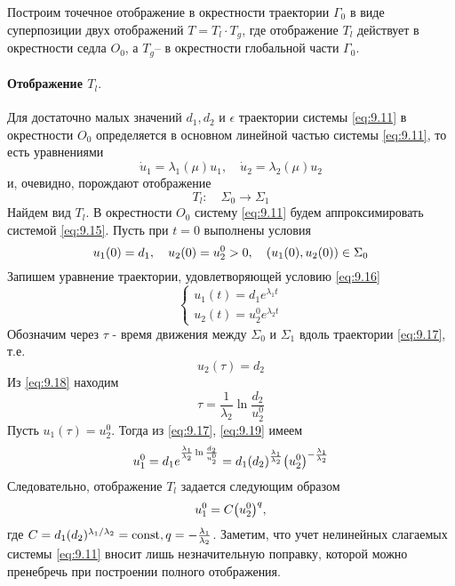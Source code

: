 Построим точечное отображение в окрестности траектории $\Gamma_0$ в виде суперпозиции двух отображений $T=T_l \cdot T_g$, где отображение $T_l$ действует в окрестности седла $O_0$, а $T_g$-- в окрестности глобальной части $\Gamma_0$.

\paragraph{Отображение $T_l.$}%

Для достаточно малых значений $d_1,d_2$ и $\epsilon$ траектории системы \eqref{eq:9.11} в окрестности $O_0$ определяется в основном линейной частью системы \eqref{eq:9.11}, то есть уравнениями
\begin{equation}
        \label{eq:9.15}
        \dot u_1 = \lambda_1(\mu) u_1,\quad \dot u_2 = \lambda_2(\mu) u_2
\end{equation}
и, очевидно, порождают отображение
\begin{equation}
        \label{eq:}
        T_l:\quad \Sigma_0 \to \Sigma_1
\end{equation}
Найдем вид $T_l$. В окрестности $O_0$ систему \eqref{eq:9.11} будем аппроксимировать системой \eqref{eq:9.15}. Пусть при $t=0$ выполнены условия
\begin{equation}
        \label{eq:9.16}
        u_1(0) = d_1, \quad u_2(0) = u_2^0>0,\quad \qty( u_1(0),u_2(0) ) \in \Sigma_0
\end{equation}
Запишем уравнение траектории, удовлетворяющей условию \eqref{eq:9.16}
\begin{equation}
        \label{eq:9.17}
        \begin{cases}
                u_1(t) = d_1 e^{\lambda_1t} \\
                u_2(t) = u_2^0 e^{\lambda_2t}
        \end{cases}
\end{equation}
Обозначим через $\tau$ - время движения между $\Sigma_0$ и $\Sigma_1 $ вдоль траектории 
\eqref{eq:9.17}, т.е.
\begin{equation}
        \label{eq:9.18}
        u_2(\tau) = d_2
\end{equation}
Из \eqref{eq:9.18} находим
\begin{equation}
        \label{eq:9.18}
        \tau = \frac{1}{\lambda_2} \ln \frac{d_2}{u_2^0}
\end{equation}
Пусть $u_1(\tau) = u_2^0.$ Тогда из \eqref{eq:9.17}, \eqref{eq:9.19} имеем
\begin{equation}
        \label{eq:}
        u_1^0 = d_1 e^{\frac{\lambda_1}{\lambda_2} \ln \frac{d_2}{u_2^0}}=
        d_1(d_2)^{\frac{\lambda_1}{\lambda_2}} \qty(u_2^0)^{-\frac{\lambda_1}{\lambda_2}}
\end{equation}
Следовательно, отображение $T_l$ задается следующим образом
\begin{equation}
        \label{eq:9.20}
        u_1^0 = C\qty(u_2^0)^q,
\end{equation}
где $C= d_1(d_2)^{\lambda_1 / \lambda_2} = \textrm{const}, q = - \frac{\lambda_1}{\lambda_2}$. Заметим, что учет нелинейных слагаемых системы \eqref{eq:9.11} вносит лишь незначительную поправку, которой можно
пренебречь при построении полного отображения.

